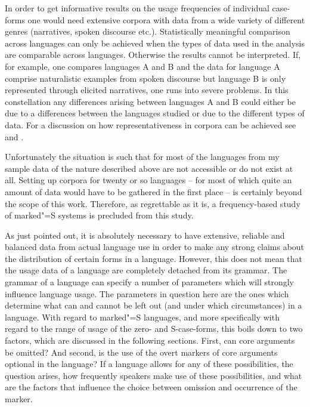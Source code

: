 In order to get informative results on the usage frequencies of individual case-forms one would need extensive corpora with data from a wide variety of different genres (narratives, spoken discourse etc.). 
Statistically meaningful comparison across languages can only be achieved when the types of data used in the analysis are comparable across languages. 
Otherwise the results cannot be interpreted. If, for example, one compares languages A and B and the data for language A comprise naturalistic examples from spoken discourse but language B is only represented through elicited narratives, one runs into severe problems.
In this constellation any differences arising between languages A and B could either be due to a differences between the languages studied or due to the different types of data. 
For a discussion on how representativeness in corpora can be achieved see \citet{Biber:1990,Biber:1993} and \citet[13--21]{McEnery:2006}.  %

Unfortunately the situation is such that for most of the languages from my sample data of the nature described above are not accessible or do not exist at all. 
Setting up corpora for twenty or so languages -- for most of which quite an amount of data would have to be gathered in the first place -- is certainly beyond the scope of this work. Therefore, as regrettable as it is, a frequency-based study of marked"=S systems is precluded from this study.

As just pointed out, it is absolutely necessary to have extensive, reliable and balanced data from actual language use in order to make any strong claims about the distribution of certain forms in a language. 
However, this does not mean that the usage data of a language are completely detached from its grammar. 
The grammar of a language can specify a number of parameters which will strongly influence language usage. 
The parameters in question here are the ones which determine what can and cannot be left out (and under which circumstances) in a language. 
With regard to marked"=S languages, and more specifically with regard to the range of usage of the zero- and S-case-forms, this boils down to two factors, which are discussed in the following sections. First, can core arguments be omitted? And second, is the use of the overt markers of core arguments optional in the language? 
If a language allows for any of these possibilities, the question arises, how frequently speakers make use of these possibilities, and what are the factors that influence the choice between omission and occurrence of the marker. 

